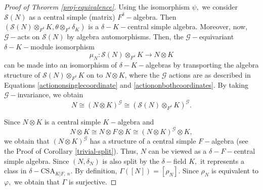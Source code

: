 \documentclass[preprint, 11pt]{amsart}
\theoremstyle{corollary}
\theoremstyle{remark}
\theoremstyle{proposition}
\numberwithin{equation}{subsection}
\begin{document}
\begin{proof}[Proof of Theorem \ref{proj-equivalence}]
	 Using the isomorphism $\psi,$ we consider  $\mathscr S(N)$ as a central simple (matrix) $F^{\delta}-$algebra. Then $(\mathscr S(N)\otimes_{F^{\delta}} K, \theta\otimes_{F^{\delta}} \delta_K)$ is a $\delta-K-$central simple algebra. Moreover, now,  $\mathscr G-$acts on $\mathscr S(N)$  by algebra automorphisms. Then, the  $\mathscr G-$equivariant $\delta-K-$module isomorphism $$\mu_N: \mathscr S(N)\otimes_{F^{\delta}} K\to N\otimes K$$ can be made into an isomorphism of $\delta-K-$algebras by transporting the algebra structure of $\mathscr S(N)\otimes_{F^{\delta}} K$ on to $N\otimes K$, where the $\mathscr{G}$ actions are as described in Equations \ref{actiononsinglecoordinate} and \ref{actiononbothcoordinates}.  By taking $\mathscr G-$invariance, we obtain  $$N\cong (N\otimes K)^{\mathscr G}\cong \left(\mathscr S(N)\otimes_{F^{\delta}} K\right)^{\mathscr G}.$$ 
	 
	 Since $N\otimes K$ is a central simple $K-$algebra and   $$N\otimes K\cong N\otimes F\otimes K\cong (N\otimes K)^\mathscr G\otimes K,$$ we obtain that $(N\otimes K)^\mathscr G$  has a structure of a central simple $F-$algebra (see the Proof of Corollary \ref{trivial-split}).  Thus,  $N$ can be viewed as a $\delta-F-$central simple algebra. Since $(N, \delta_N)$ is also split by the $\delta-$field $K,$ it represents a class in $\delta-\mathrm{CSA}_{K|F,\ n}.$ By definition, $\Gamma ([N])=[\rho_N].$  Since $\rho_N$ is equivalent to $\varphi,$ we obtain that $\Gamma$ is surjective.\end{proof}
	
\end{document}
